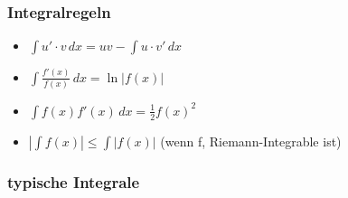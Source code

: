 \subsubsection{Integralregeln}
\begin{itemize}[leftmargin=*]
	\item $\int u'\cdot v \, dx = uv - \int u \cdot v' \, dx$
	\item $\int \frac{f'(x)}{f(x)} \, dx = \ln|f(x)|$
	\item $\int f(x)f'(x) \, dx = \frac{1}{2}f(x)^2$
	\item $|\int f(x)| \leq \int |f(x)|$ (wenn f, Riemann-Integrable ist)
\end{itemize}

\subsubsection{typische Integrale}
